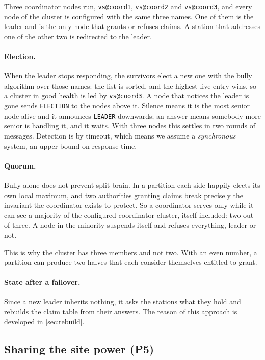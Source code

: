 Three coordinator nodes run, \texttt{vs@coord1}, \texttt{vs@coord2} and
\texttt{vs@coord3}, and every node of the cluster is configured with the same
three names. One of them is the leader and is the only node that grants or refuses
claims. A station that addresses one of the other two is redirected to the leader.

\paragraph{Election.} When the leader stops responding, the survivors elect a new
one with the bully algorithm over those names: the list is sorted, and the highest
live entry wins, so a cluster in good health is led by \texttt{vs@coord3}. A node that notices the leader is gone sends \texttt{ELECTION}
to the nodes above it. Silence means it is the most senior node alive and it
announces \texttt{LEADER} downwards; an answer means somebody more senior is
handling it, and it waits. With three nodes this settles in two rounds of
messages. Detection is by timeout, which means we assume a \emph{synchronous}
system, an upper bound on response time.

\paragraph{Quorum.} Bully alone does not prevent split brain. In a partition each
side happily elects its own local maximum, and two authorities granting claims
break precisely the invariant the coordinator exists to protect. So a coordinator
serves only while it can see a majority of the configured coordinator cluster,
itself included: two out of three. A node in the minority suspends itself and
refuses everything, leader or not.

This is why the cluster has three members and not two. With an even number, a
partition can produce two halves that each consider themselves entitled to grant.

\paragraph{State after a failover.} Since a new leader inherits nothing, it asks the stations what they hold and
rebuilds the claim table from their answers. The reason of this approach is developed in
\cref{sec:rebuild}.

\subsection{Sharing the site power (P5)}
\label{sec:p5}

